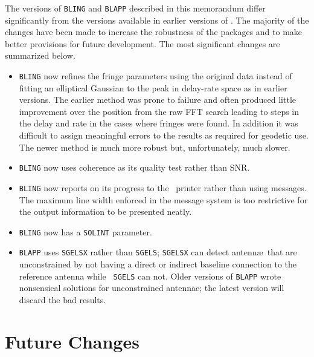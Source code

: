 The versions of {\tt BLING} and {\tt BLAPP} described in this
memorandum differ significantly from the versions available in earlier
versions of \AIPS.  The majority of the changes have been made to
increase the robustness of the packages and to make better provisions
for future development.  The most significant changes are summarized
below.
\begin{itemize}
\item
{\tt BLING} now refines the fringe parameters using the original data
instead of fitting an elliptical Gaussian to the peak in delay-rate
space as in earlier versions.  The earlier method was prone to failure
and often produced little improvement over the position from the raw
FFT search leading to steps in the delay and rate in the cases where
fringes were found.  In addition it was difficult to assign meaningful
errors to the results as required for geodetic use.  The newer method
is much more robust but, unfortunately, much slower.

\item
{\tt BLING} now uses coherence as its quality test rather than SNR.

\item
{\tt BLING} now reports on its progress to the \AIPS\ printer rather
than using messages.  The maximum line width enforced in the message
system is too restrictive for the output information to be presented
neatly.

\item
{\tt BLING} now has a {\tt SOLINT} parameter.

\item
{\tt BLAPP} uses {\tt SGELSX} rather than {\tt SGELS}; {\tt SGELSX}
can detect antenn\ae\ that are unconstrained by not having a direct or
indirect baseline connection to the reference antenna while {\tt
SGELS} can not.  Older versions of {\tt BLAPP} wrote nonsensical
solutions for unconstrained antennae; the latest version will discard
the bad results.
\end{itemize}

\section{Future Changes}

